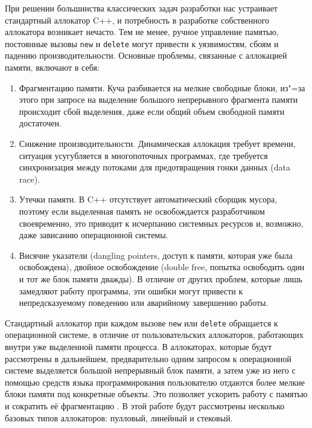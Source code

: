 При решении большинства классических задач разработки нас устраивает стандартный аллокатор C++, и потребность в разработке собственного аллокатора возникает нечасто. Тем не менее, ручное управление памятью, постоянные вызовы \texttt{new} и \texttt{delete} могут привести к уязвимостям, сбоям и падению производительности. Основные проблемы, связанные с аллокацией памяти, включают в себя:

\begin{enumerate}
	\item Фрагментацию памяти. Куча разбивается на мелкие свободные блоки, из"=за этого при запросе на выделение большого непрерывного фрагмента памяти происходит сбой выделения, даже если общий объем свободной памяти достаточен.
	\item Снижение производительности. Динамическая аллокация требует времени, ситуация усугубляется в многопоточных программах, где требуется синхронизация между потоками для предотвращения гонки данных (data race).
	\item Утечки памяти. В C++ отсутствует автоматический сборщик мусора, поэтому если выделенная память не освобождается разработчиком своевременно, это приводит к исчерпанию системных ресурсов и, возможно, даже зависанию операционной системы. 
	\item Висячие указатели (dangling pointers, доступ к памяти, которая уже была освобождена), двойное освобождение (double free, попытка освободить один и тот же блок памяти дважды). В отличие от других проблем, которые лишь замедляют работу программы, эти ошибки могут привести к непредсказуемому поведению или аварийному завершению работы.
\end{enumerate}

Стандартный аллокатор при каждом вызове \texttt{new} или \texttt{delete} обращается к операционной системе, в отличие от пользовательских аллокаторов, работающих внутри уже выделенной памяти процесса. В аллокаторах, которые будут рассмотрены в дальнейшем, предварительно одним запросом к операционной системе выделяется большой непрерывный блок памяти, а затем уже из него с помощью средств языка программирования пользователю отдаются более мелкие блоки памяти под конкретные объекты. Это позволяет ускорить работу с памятью и сократить её фрагментацию \cite{pre-allocation}. В этой работе будут рассмотрены несколько базовых типов аллокаторов: пулловый, линейный и стековый.
